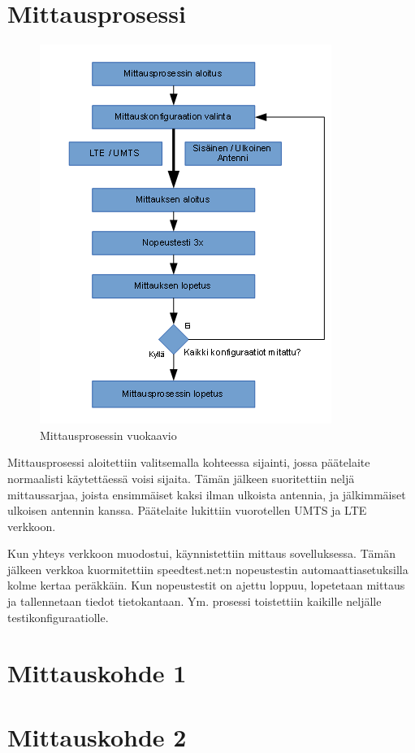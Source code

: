 \documentclass[11pt,a4paper,oneside,article,finnish]{memoir}
\begin{document}
\section{Mittausprosessi}
\begin{figure}[H]
	\centering
	\includegraphics[scale=1.0]{mittausprosessi_flowchart}
	\caption{Mittausprosessin vuokaavio}
	\label{fig:mittausprosessi_flowchart}
\end{figure}
Mittausprosessi aloitettiin valitsemalla kohteessa sijainti, jossa päätelaite normaalisti käytettäessä voisi sijaita. Tämän jälkeen suoritettiin neljä mittaussarjaa, joista ensimmäiset kaksi ilman ulkoista antennia, ja jälkimmäiset ulkoisen antennin kanssa. Päätelaite lukittiin vuorotellen UMTS ja LTE verkkoon. 

Kun yhteys verkkoon muodostui, käynnistettiin mittaus sovelluksessa. Tämän jälkeen verkkoa kuormitettiin speedtest.net:n nopeustestin automaattiasetuksilla kolme kertaa peräkkäin. Kun nopeustestit on ajettu loppuu, lopetetaan mittaus ja tallennetaan tiedot tietokantaan. Ym. prosessi toistettiin kaikille neljälle testikonfiguraatiolle.

\section{Mittauskohde 1}
\section{Mittauskohde 2}
\end{document}
